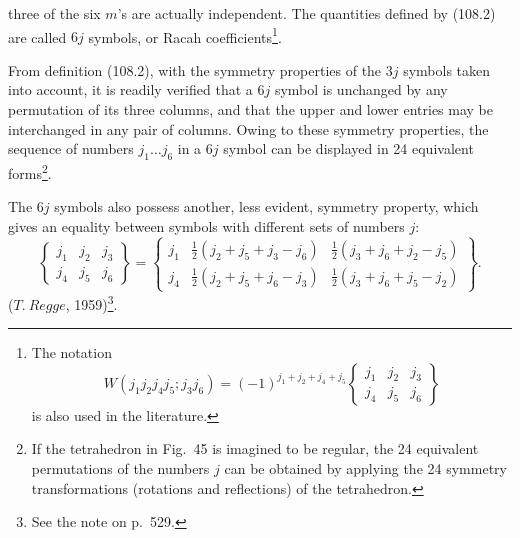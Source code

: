 three of the six $m$'s are actually independent. The quantities defined by (108.2) are called $6j$ symbols, or Racah coefficients\footnote{The notation
\[
W(j_1j_2j_4j_5;j_3j_6)=(-1)^{j_1+j_2+j_4+j_5}
\left\{\begin{matrix}j_1&j_2&j_3\\j_4&j_5&j_6\end{matrix}\right\}
\]
is also used in the literature.}.

From definition (108.2), with the symmetry properties of the $3j$ symbols taken into account, it is readily verified that a $6j$ symbol is unchanged by any permutation of its three columns, and that the upper and lower entries may be interchanged in any pair of columns. Owing to these symmetry properties, the sequence of numbers $j_1\ldots j_6$ in a $6j$ symbol can be displayed in 24 equivalent forms\footnote{If the tetrahedron in Fig.~45 is imagined to be regular, the 24 equivalent permutations of the numbers $j$ can be obtained by applying the 24 symmetry transformations (rotations and reflections) of the tetrahedron.}.

\begin{figure}[htbp]
\centering
{}
\caption{}
\label{fig:45}
\end{figure}

The $6j$ symbols also possess another, less evident, symmetry property, which gives an equality between symbols with different sets of numbers $j$:
\begin{equation}
\left\{\begin{matrix}j_1&j_2&j_3\\j_4&j_5&j_6\end{matrix}\right\}=
\left\{\begin{matrix}
j_1&\frac12(j_2+j_5+j_3-j_6)&\frac12(j_3+j_6+j_2-j_5)\\
j_4&\frac12(j_2+j_5+j_6-j_3)&\frac12(j_3+j_6+j_5-j_2)
\end{matrix}\right\}.
\tag{108.3}
\end{equation}
($T.\ Regge$, 1959)\footnote{See the note on p.~529.}.

